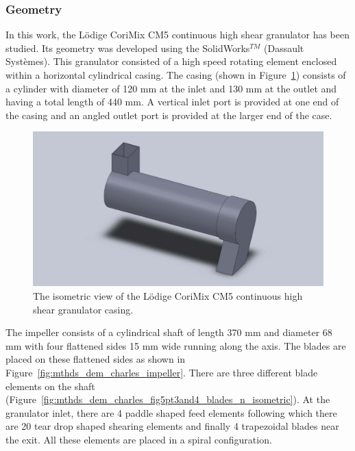 \documentclass[preprint,11pt,authoryear]{elsarticle}
\begin{document}
\subsubsection{Geometry}    
 In this work, the L\"{o}dige CoriMix CM5 continuous high shear granulator has been studied. Its 
geometry was developed using the SolidWorks$^{TM}$ (Dassault Syst\`{e}mes). This granulator 
consisted of a high speed rotating element enclosed within a horizontal cylindrical casing. The casing 
(shown in Figure~\ref{fig:mthdsDemCharlesGranShell}) consists of a cylinder with diameter of 120 mm 
at the inlet and 130 mm at the outlet and having a total length of 440 mm. A vertical inlet port is 
provided at one end of the casing and an angled outlet port is provided at the larger end of the case. 

\begin{figure}
\centering
\includegraphics[scale=0.2]{shell_final_pic.pdf}
\caption{The isometric view of the L\"{o}dige CoriMix CM5 continuous high shear granulator casing.}
\label{fig:mthdsDemCharlesGranShell}
\end{figure}

The impeller consists of a cylindrical shaft of length 370 mm and diameter 68 mm with four 
flattened sides 15 mm wide running along the axis. The blades are placed on these flattened sides as 
shown in Figure~\ref{fig:mthds_dem_charles_impeller}. There are three different blade elements on the 
shaft (Figure~\ref{fig:mthds_dem_charles_fig5pt3and4_blades_n_isometric}). At the granulator inlet, 
there are 4 paddle shaped feed elements following which there are 20 tear drop shaped shearing 
elements  and finally 4 trapezoidal blades near the exit. All these elements are placed in 
a spiral configuration. 
\end{document}
